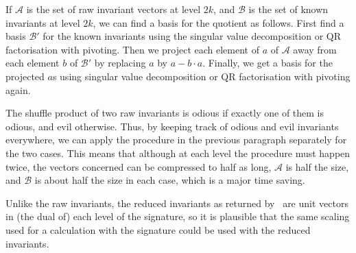 If $\mathcal{A}$ is the set of raw invariant vectors at level $2k$, and $\mathcal{B}$  is the set of known invariants at level $2k$, we can find a basis for the quotient as follows. First find a basis $\mathcal{B'}$ for the known invariants using the singular value decomposition or QR factorisation with pivoting. Then we project each element of $a$ of $\mathcal{A}$ away from each element $b$ of $\mathcal{B'}$ by replacing $a$ by $a-b\cdot a$. Finally, we get a basis for the projected $a$s using singular value decomposition or QR factorisation with pivoting again.

The shuffle product of two raw invariants is odious if exactly one of them is odious, and evil otherwise. Thus, by keeping track of odious and evil invariants everywhere, we can apply the procedure in the previous paragraph separately for the two cases. This means that although at each level the procedure must happen twice, the vectors concerned can be compressed to half as long, $\mathcal{A}$ is half the size, and $\mathcal{B}$ is about half the size in each case, which is a major time saving. %


Unlike the raw invariants, the reduced invariants as returned by \ii\ are %
unit vectors in (the dual of) each level of the signature, so it is plausible that the same scaling used for a calculation with the signature could be used with the reduced invariants.


\endDocumentJR
